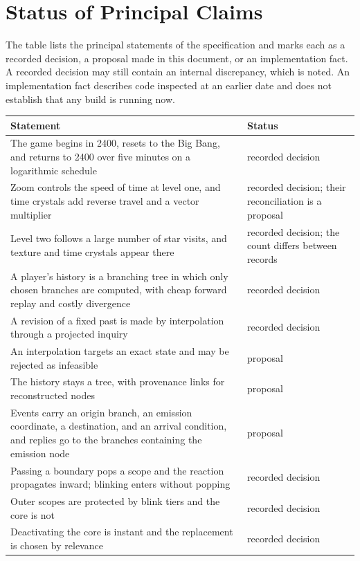 \documentclass[11pt]{article}
\begin{document}
\appendix
\section{Status of Principal Claims}
\label{app:status}

The table lists the principal statements of the specification and marks each as a recorded decision, a proposal made in this document, or an implementation fact. A recorded decision may still contain an internal discrepancy, which is noted. An implementation fact describes code inspected at an earlier date and does not establish that any build is running now.

\begin{longtable}{@{}p{9.4cm}p{3.1cm}@{}}
\toprule
Statement & Status \\
\midrule
\endhead
The game begins in 2400, resets to the Big Bang, and returns to 2400 over five minutes on a logarithmic schedule & recorded decision \\
Zoom controls the speed of time at level one, and time crystals add reverse travel and a vector multiplier & recorded decision; their reconciliation is a proposal \\
Level two follows a large number of star visits, and texture and time crystals appear there & recorded decision; the count differs between records \\
A player's history is a branching tree in which only chosen branches are computed, with cheap forward replay and costly divergence & recorded decision \\
A revision of a fixed past is made by interpolation through a projected inquiry & recorded decision \\
An interpolation targets an exact state and may be rejected as infeasible & proposal \\
The history stays a tree, with provenance links for reconstructed nodes & proposal \\
Events carry an origin branch, an emission coordinate, a destination, and an arrival condition, and replies go to the branches containing the emission node & proposal \\
Passing a boundary pops a scope and the reaction propagates inward; blinking enters without popping & recorded decision \\
Outer scopes are protected by blink tiers and the core is not & recorded decision \\
Deactivating the core is instant and the replacement is chosen by relevance & recorded decision \\

\end{longtable}
\end{document}

